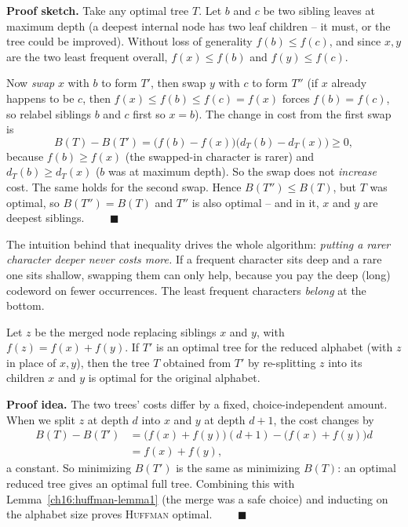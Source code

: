 \begin{formalbox}
\textbf{Proof sketch.} Take any optimal tree $T$. Let $b$ and $c$ be two sibling
leaves at maximum depth (a deepest internal node has two leaf children -- it must,
or the tree could be improved). Without loss of generality $f(b) \le f(c)$, and
since $x, y$ are the two least frequent overall, $f(x) \le f(b)$ and
$f(y) \le f(c)$.

Now \emph{swap} $x$ with $b$ to form $T'$, then swap $y$ with $c$ to form $T''$
(if $x$ already happens to be $c$, then $f(x) \le f(b) \le f(c) = f(x)$ forces
$f(b) = f(c)$, so relabel siblings $b$ and $c$ first so $x = b$).
The change in cost from the first swap is
\[
  B(T) - B(T') = \bigl(f(b) - f(x)\bigr)\bigl(d_T(b) - d_T(x)\bigr) \ge 0,
\]
because $f(b) \ge f(x)$ (the swapped-in character is rarer) and $d_T(b) \ge
d_T(x)$ ($b$ was at maximum depth). So the swap does not \emph{increase} cost.
The same holds for the second swap. Hence $B(T'') \le B(T)$, but $T$ was optimal,
so $B(T'') = B(T)$ and $T''$ is also optimal -- and in it, $x$ and $y$ are
deepest siblings. $\qquad\blacksquare$
\end{formalbox}

The intuition behind that inequality drives the whole algorithm:
\emph{putting a rarer character deeper never costs more.} If a frequent character
sits deep and a rare one sits shallow, swapping them can only help, because you
pay the deep (long) codeword on fewer occurrences. The least frequent characters
\emph{belong} at the bottom.

\begin{lemma}
\label{ch16:huffman-lemma2}
Let $z$ be the merged node replacing siblings $x$ and $y$, with $f(z) = f(x) +
f(y)$. If $T'$ is an optimal tree for the reduced alphabet (with $z$ in place of
$x,y$), then the tree $T$ obtained from $T'$ by re-splitting $z$ into its
children $x$ and $y$ is optimal for the original alphabet.
\end{lemma}

\begin{formalbox}
\textbf{Proof idea.} The two trees' costs differ by a fixed, choice-independent
amount. When we split $z$ at depth $d$ into $x$ and $y$ at depth $d+1$, the cost
changes by
\begin{align*}
  B(T) - B(T') &= \bigl(f(x) + f(y)\bigr)(d{+}1) - \bigl(f(x)+f(y)\bigr)d \\
               &= f(x) + f(y),
\end{align*}
a constant. So minimizing $B(T')$ is the same as minimizing $B(T)$: an optimal
reduced tree gives an optimal full tree. Combining this with
Lemma~\ref{ch16:huffman-lemma1} (the merge was a safe choice) and inducting on
the alphabet size proves \textsc{Huffman} optimal. $\qquad\blacksquare$
\end{formalbox}

